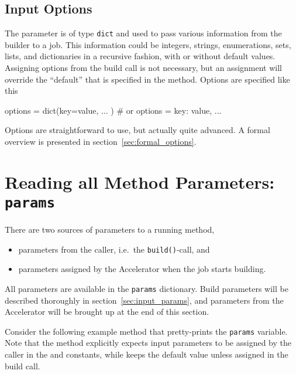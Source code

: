 \subsection*{Input Options}

The \options parameter is of type \texttt{dict} and used to pass
various information from the builder to a job.  This information could
be integers, strings, enumerations, sets, lists, and dictionaries in a
recursive fashion, with or without default values.  Assigning options
from the build call is not necessary, but an assignment will override
the ``default'' that is specified in the method.  Options are
specified like this
\begin{python}
  options = dict(key=value, ... )  # or
  options = {key: value, ...}
\end{python}

Options are straightforward to use, but actually quite advanced.  A
formal overview is presented in section~\ref{sec:formal_options}.





\section{Reading all Method Parameters:  \texttt{params}}
\label{sec:params}

There are two sources of parameters to a running method,
\begin{itemize}
\item [] parameters from the caller, i.e.\ the \texttt{build()}-call, and
\item [] parameters assigned by the Accelerator when the job starts building.
\end{itemize}
All parameters are available in the \texttt{params} dictionary.  Build
parameters will be described thoroughly in
section~\ref{sec:input_params}, and parameters from the Accelerator
will be brought up at the end of this section.

Consider the following example method that pretty-prints
the \texttt{params} variable.  Note that the method explicitly expects
input parameters to be assigned by the caller in the \jobids
and \datasets constants, while \options keeps the default value unless
assigned in the build call.

